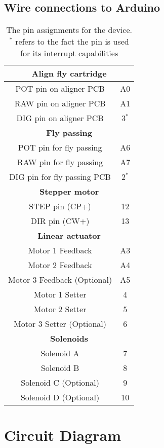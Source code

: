 \documentclass[12pt]{article}
\begin{document}
\subsection{Wire connections to Arduino}

\begin{table}[H]
	\centering
	\begin{tabular}{c c}
		\multicolumn{2}{c}{\textbf{Align fly cartridge}}\\ \midrule
		POT pin on aligner PCB & A0 \\
		RAW pin on aligner PCB & A1 \\
		DIG pin on aligner PCB & 3$^*$ \\ \midrule
		\multicolumn{2}{c}{\textbf{Fly passing}}\\ \midrule
		POT pin for fly passing & A6 \\
		RAW pin for fly passing & A7 \\
		DIG pin for fly passing PCB & 2$^*$ \\ \midrule
		\multicolumn{2}{c}{\textbf{Stepper motor}}\\ \midrule
		STEP pin (CP+) & 12 \\
		DIR pin (CW+) & 13 \\ \midrule
		\multicolumn{2}{c}{\textbf{Linear actuator}}\\ \midrule
		Motor 1 Feedback & A3 \\
		Motor 2 Feedback & A4 \\
		Motor 3 Feedback (Optional) & A5 \\
		Motor 1 Setter & 4 \\
		Motor 2 Setter & 5\\		
		Motor 3 Setter (Optional) & 6\\ \midrule
		\multicolumn{2}{c}{\textbf{Solenoids}}\\ \midrule
		Solenoid A & 7 \\
		Solenoid B & 8 \\
		Solenoid C (Optional) & 9 \\
		Solenoid D (Optional) & 10\\
	\end{tabular}
	\caption{The pin assignments for the device. $^*$ refers to the fact the pin is used for its interrupt capabilities}
\end{table}

\section{Circuit Diagram}

\end{document}
